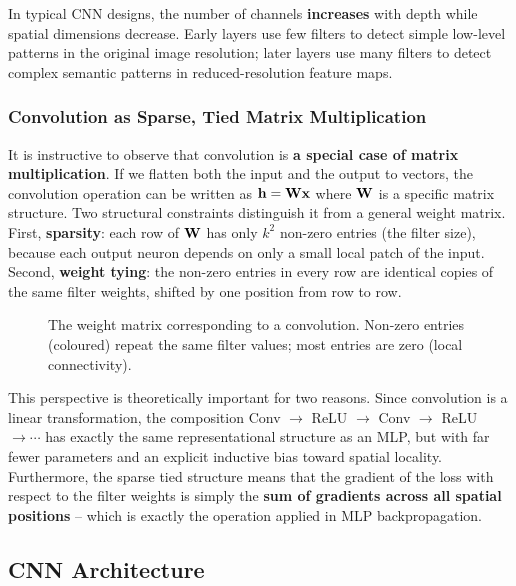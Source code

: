 In typical CNN designs, the number of channels \textbf{increases} with depth while spatial dimensions decrease. Early layers use few filters to detect simple low-level patterns in the original image resolution; later layers use many filters to detect complex semantic patterns in reduced-resolution feature maps.

\subsubsection{Convolution as Sparse, Tied Matrix Multiplication}

It is instructive to observe that convolution is \textbf{a special case of matrix multiplication}. If we flatten both the input and the output to vectors, the convolution operation can be written as $\mathbf{h} = \mathbf{W} \mathbf{x}$ where $\mathbf{W}$ is a specific matrix structure. Two structural constraints distinguish it from a general weight matrix. First, \textbf{sparsity}: each row of $\mathbf{W}$ has only $k^2$ non-zero entries (the filter size), because each output neuron depends on only a small local patch of the input. Second, \textbf{weight tying}: the non-zero entries in every row are identical copies of the same filter weights, shifted by one position from row to row.

\begin{figure}
    \centering
    \resizebox{0.38\textwidth}{!}{}
    \caption{The weight matrix corresponding to a convolution. Non-zero entries (coloured) repeat the same filter values; most entries are zero (local connectivity).}
    \label{fig:conv_matrix}
\end{figure}

This perspective is theoretically important for two reasons. Since convolution is a linear transformation, the composition Conv $\to$ ReLU $\to$ Conv $\to$ ReLU $\to \cdots$ has exactly the same representational structure as an MLP, but with far fewer parameters and an explicit inductive bias toward spatial locality. Furthermore, the sparse tied structure means that the gradient of the loss with respect to the filter weights is simply the \textbf{sum of gradients across all spatial positions} -- which is exactly the operation applied in MLP backpropagation.

\subsection{CNN Architecture}
\label{sec:cnns:architecture}

